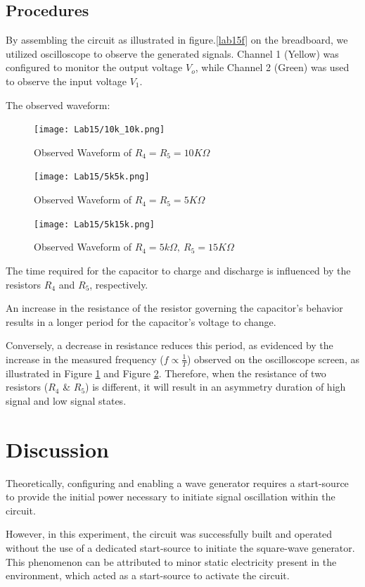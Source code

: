     \subsection{Procedures}
    By assembling the circuit as illustrated in figure.\ref{lab15f} on the breadboard, we utilized oscilloscope to observe the generated signals. Channel 1 (Yellow) was configured to monitor the output voltage $V_o$, while Channel 2 (Green) was used to observe the input voltage $V_1$.\par
    The observed waveform:\par
    \begin{figure}[h]
        \centering
        \texttt{[image: Lab15/10k\_10k.png]}
        \caption{Observed Waveform of $R_4=R_5=10K\Omega$}
        \label{L510k10k}
    \end{figure}
    \FloatBarrier
    \begin{figure}[h]
        \centering
        \texttt{[image: Lab15/5k5k.png]}
        \caption{Observed Waveform of $R_4=R_5=5K\Omega$}
        \label{L55k5k}
    \end{figure}
    \FloatBarrier
    \begin{figure}[h]
        \centering
        \texttt{[image: Lab15/5k15k.png]}
        \caption{Observed Waveform of $R_4=5k\Omega,~R_5=15K\Omega$}
        \label{L55k15k}
    \end{figure}
    \FloatBarrier
    The time required for the capacitor to charge and discharge is influenced by the resistors $R_4$ and $R_5$, respectively.\par
    An increase in the resistance of the resistor governing the capacitor's behavior results in a longer period for the capacitor's voltage to change.\par
    Conversely, a decrease in resistance reduces this period, as evidenced by the increase in the measured frequency ($f \propto \frac{1}{T}$) observed on the oscilloscope screen, as illustrated in Figure \ref{L510k10k} and Figure \ref{L55k5k}.
    Therefore, when the resistance of two resistors ($R_4$ \& $R_5$) is different, it will result in an asymmetry duration of high signal and low signal states.
    
\section{Discussion}
    Theoretically, configuring and enabling a wave generator requires a start-source to provide the initial power necessary to initiate signal oscillation within the circuit.\par
    However, in this experiment, the circuit was successfully built and operated without the use of a dedicated start-source to initiate the square-wave generator. This phenomenon can be attributed to minor static electricity present in the environment, which acted as a start-source to activate the circuit.

